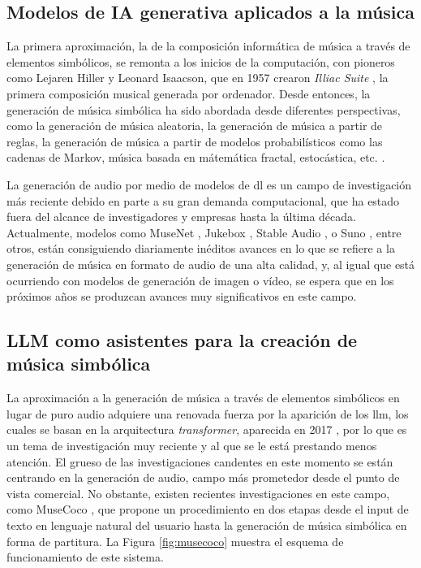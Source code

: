 \subsection{Modelos de IA generativa aplicados a la música}

La primera aproximación, la de la composición informática de música a través de elementos simbólicos, se remonta a los inicios de la computación, con pioneros como Lejaren Hiller y Leonard Isaacson, que en 1957 crearon \emph{Illiac Suite} \citep{arizaTwoPioneeringProjects2011,funkMusicalSuiteComposed2018a}, la primera composición musical generada por ordenador. Desde entonces, la generación de música simbólica ha sido abordada desde diferentes perspectivas, como la generación de música aleatoria, la generación de música a partir de reglas, la generación de música a partir de modelos probabilísticos como las cadenas de Markov, música basada en mátemática fractal, estocástica, etc. \citep{hernandez-olivanSurveyArtificialIntelligence2022}. 

La generación de audio por medio de modelos de \gls{dl} es un campo de investigación más reciente debido en parte a su gran demanda computacional, que ha estado fuera del alcance de investigadores y empresas hasta la última década. Actualmente, modelos como {MuseNet}  \citep{departmentofcomputersciencesrminstituteofscienceandtechnologychennaiindia.MusenetMusicGeneration2020a}, {Jukebox} \citep{dhariwalJukeboxGenerativeModel2020}, {Stable Audio} \citep{StableAudioFast}, o {Suno} \citep{SunoAI}, entre otros, están consiguiendo diariamente inéditos avances en lo que se refiere a la generación de música en formato de audio de una alta calidad, y, al igual que está ocurriendo con modelos de generación de imagen o vídeo, se espera que en los próximos años se produzcan avances muy significativos en este campo.


\subsection{LLM como asistentes para la creación de música simbólica}
\label{sec:llm_asistentes_creacion_codigo_programacion}

La aproximación a la generación de música a través de elementos simbólicos en lugar de puro audio adquiere una renovada fuerza por la aparición de los \gls{llm}, los cuales se basan en la arquitectura \emph{transformer}, aparecida en 2017 \citep{vaswaniAttentionAllYou2017}, por lo que es un tema de investigación muy reciente y al que se le está prestando menos atención. El grueso de las investigaciones candentes en este momento se están centrando en la generación de audio, campo más prometedor desde el punto de vista comercial. No obstante, existen recientes investigaciones en este campo, como {MuseCoco} \citep{luMuseCocoGeneratingSymbolic2023}, que propone un procedimiento en dos etapas desde el input de texto en lenguaje natural del usuario hasta la generación de música simbólica en forma de partitura. La Figura \ref{fig:musecoco} muestra el esquema de funcionamiento de este sistema. 

